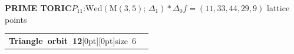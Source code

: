 \documentclass[14pt]{extarticle}
\makeatletter
\newcommand{\AtlasSupportOrbitSplit}[2]{%
  \begin{tabularx}{\linewidth}[t]{%
    @{}>{\raggedright\arraybackslash}p{.37\linewidth}%
    @{\hspace{2.5mm}\AtlasOrbitDivider\hspace{2.5mm}}%
    >{\raggedright\arraybackslash}X@{}}%
    \begin{minipage}[t]{\linewidth}\vspace{0pt}#1\end{minipage} &
    \begin{minipage}[t]{\linewidth}\vspace{0pt}#2\end{minipage}
  \end{tabularx}}
\makeatother
\begin{document}
\begin{atlasbox}\begin{atlaspanel}
\textcolor{toricgreen}{\bfseries PRIME TORIC}\quad \(P_{11}\):\enspace \(\mathrm{Wed}(\mathrm{M}(3,5);\,\Delta_1)\ast\Delta_{0}\)\quad \(f=(11,33,44,29,9)\) lattice points
\end{atlaspanel}\end{atlasbox}
\clearpage
\begin{atlaspanel}[top=1mm,bottom=2mm]
\AtlasSupportOrbitSplit{%
\vspace*{-3mm}\mbox{{\LARGE\bfseries Triangle orbit 12}\hspace{3mm}\raisebox{.8mm}[0pt][0pt]{{\fontsize{16}{18}\selectfont\color{muted}size 6}}}%
}{%
\vspace*{-3mm}{\fontsize{13}{16}\selectfont{\color{muted}\(\mathbb{Q}\) and \(\mathbb{F}_2\)}\quad{\color{muted}\(\underline{\{3,\,15,\,21\}}\), \(\{5,\,15,\,22\}\), \(\{14,\,16,\,29\}\), \(\{14,\,15,\,27\}\), \(\{22,\,29,\,46\}\), \(\{21,\,29,\,47\}\)}\rule[-3mm]{0pt}{3mm}}%
}%
\end{atlaspanel}\vspace{2mm}
\end{document}
